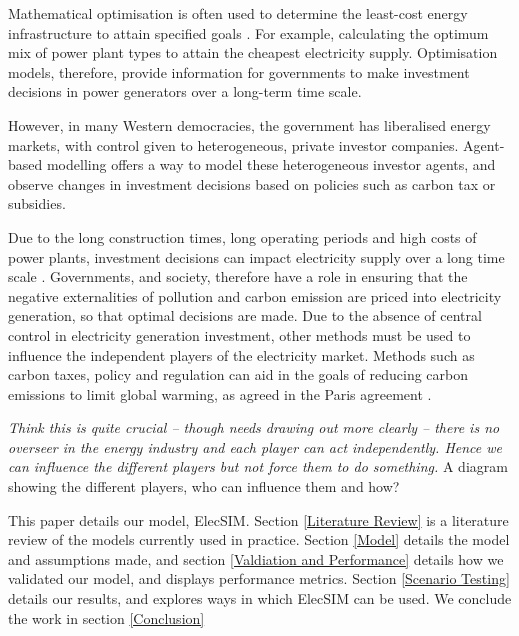 Mathematical optimisation is often used to determine the least-cost energy infrastructure to attain specified goals \cite{Papadelis2012}. For example, calculating the optimum mix of power plant types to attain the cheapest electricity supply. Optimisation models, therefore, provide information for governments to make investment decisions in power generators over a long-term time scale. 

However, in many Western democracies, the government has liberalised energy markets, with control given to heterogeneous, private investor companies. Agent-based modelling offers a way to model these heterogeneous investor agents, and observe changes in investment decisions based on policies such as carbon tax or subsidies.

Due to the long construction times, long operating periods and high costs of power plants, investment decisions can impact electricity supply over a long time scale \cite{Chappin2017}. Governments, and society, therefore have a role in ensuring that the negative externalities of pollution and carbon emission are priced into electricity generation, so that optimal decisions are made. Due to the absence of central control in electricity generation investment, other methods must be used to influence the independent players of the electricity market. Methods such as carbon taxes, policy and regulation can aid in the goals of reducing carbon emissions to limit global warming, as agreed in the Paris agreement \cite{May2002}.

 {\color{red} \textit{Think this is quite crucial -- though needs drawing out more clearly -- there is no overseer in the energy industry and each player can act independently. Hence we can influence the different players but not force them to do something.} A diagram showing the different players, who can influence them and how?}

This paper details our model, ElecSIM. Section \ref{Literature Review} is a literature review of the models currently used in practice. Section \ref{Model} details the model and assumptions made, and section \ref{Valdiation and Performance} details how we validated our model, and displays performance metrics. Section \ref{Scenario Testing} details our results, and explores ways in which ElecSIM can be used. We conclude the work in section \ref{Conclusion}
 

